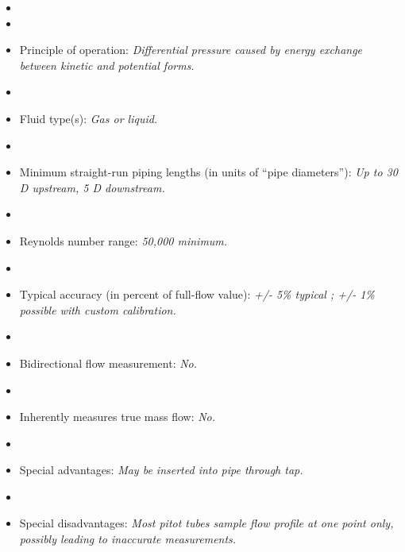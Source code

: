 \begin{itemize}
\goodbreak
\item{} 
\vskip 5pt
\item\item{} Principle of operation: {\it Differential pressure caused by energy exchange between kinetic and potential forms.}
\vskip 5pt
\item\item{} Fluid type(s): {\it Gas or liquid.}
\vskip 5pt
\item\item{} Minimum straight-run piping lengths (in units of ``pipe diameters''): {\it Up to 30 D upstream, 5 D downstream.}
\vskip 5pt
\item\item{} Reynolds number range: {\it 50,000 minimum.}
\vskip 5pt
\item\item{} Typical accuracy (in percent of full-flow value): {\it +/- 5\% typical ; +/- 1\% possible with custom calibration.}
\vskip 5pt
\item\item{} Bidirectional flow measurement: {\it No.}
\vskip 5pt
\item\item{} Inherently measures true mass flow: {\it No.}
\vskip 5pt
\item\item{} Special advantages: {\it May be inserted into pipe through tap.}
\vskip 5pt
\item\item{} Special disadvantages: {\it Most pitot tubes sample flow profile at one point only, possibly leading to inaccurate measurements.}
\end{itemize}

